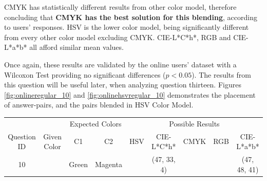 CMYK has statistically different results from other color model, therefore concluding that \textbf{CMYK has the best solution for this blending}, according to
users' responses. HSV is the lower color model, being significantly different from every other color model excluding CMYK. CIE-L*C*h*, RGB and CIE-L*a*b* all afford similar mean values. \par
%
Once again, these results are validated by the online users' dataset with a Wilcoxon Test providing no significant differences ($p < 0.05$). The results from this question will be useful later, when
analyzing question thirteen. Figures \ref{fig:onlineregular_10} and \ref{fig:onlinehsvregular_10} demonstrates the placement of answer-pairs, and the pairs blended in HSV Color Model.
%
\begin{table}[htbp]
  \resizebox{\textwidth}{!} {
  \begin{tabular}{lccccccccccccc}
    \hline
    \multicolumn{1}{c}{}                              &                                      & \multicolumn{2}{c}{Expected Colors}                   & \multicolumn{10}{c}{Possible Results}                                                                                                                                                                                                                                                                                        \\ \cline{3-14}
    \multicolumn{1}{c}{\multirow{-2}{*}{Question ID}} & \multirow{-2}{*}{Given Color}        & C1                       & C2                         & \multicolumn{2}{c}{HSV}                                        & \multicolumn{2}{c}{CIE-L*C*h*}                                 & \multicolumn{2}{c}{CMYK}                                       & \multicolumn{2}{c}{RGB}                                        & \multicolumn{2}{c}{CIE-L*a*b*}                                 \\ \hline
    \multicolumn{1}{c}{10}                             & \cellcolor[HTML]{0080FF}{\color[HTML]{FFFFFF}(26, 23, 98)} & \multicolumn{1}{c|}{Green} & \multicolumn{1}{c|}{Magenta}  & \multicolumn{2}{c|}{\cellcolor[HTML]{0080FF}{\color[HTML]{FFFFFF}(26, 23, 98)}}      & \multicolumn{2}{c|}{\cellcolor[HTML]{FF6F00}(47, 33, 4)}       & \multicolumn{2}{c|}{\cellcolor[HTML]{808080}{\color[HTML]{FFFFFF}(21, 22, 24)}}       & \multicolumn{2}{c|}{\cellcolor[HTML]{808080}{\color[HTML]{FFFFFF}(21, 22, 24)}}       & \multicolumn{2}{c|}{\cellcolor[HTML]{C9B2A2}(47, 48, 41)}       \\ \hline

\end{tabular}}
\end{table}
